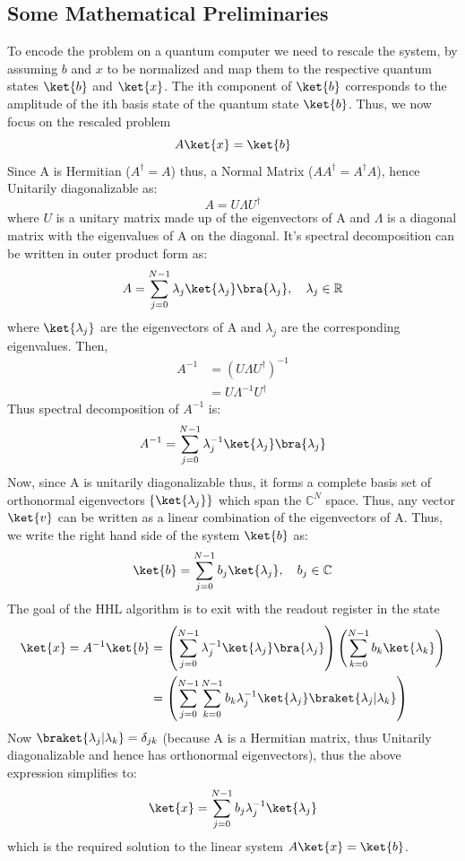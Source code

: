 \documentclass[12pt, oneside]{book}
\theoremstyle{definition}
\theoremstyle{definition}
\theoremstyle{remark}
\begin{document}
\subsection{Some Mathematical Preliminaries}
To encode the problem on a quantum computer we need to rescale the system, by assuming $b$ and $x$ to be normalized and map them to the respective quantum states $\ket{b}$ and $\ket{x}$. The ith component of $\ket{b}$ corresponds to the amplitude of the ith basis state of the quantum state $\ket{b}$. Thus, we now focus on the rescaled problem
\[
A\ket{x}=\ket{b}
\]
Since A is Hermitian ($A^{\dagger}=A$) thus, a Normal Matrix ($AA^{\dagger}=A^{\dagger}A$), hence Unitarily diagonalizable as:
\[
    A=U\Lambda U^{\dagger}
\]
where $U$ is a unitary matrix made up of the eigenvectors of A and $\Lambda$ is a diagonal matrix with the eigenvalues of A on the diagonal.
It's spectral decomposition can be written in outer product form as:
\[
    A=\sum_{j=0}^{N-1}\lambda_j\ket{\lambda_j}\bra{\lambda_j}, \quad \lambda_j\in \mathbb{R}
\]
where $\ket{\lambda_j}$ are the eigenvectors of A and $\lambda_j$ are the corresponding eigenvalues.
Then,
\begin{align*}
    A^{-1}&=(U\Lambda U^{\dagger})^{-1}\\
    &=U\Lambda^{-1}U^{\dagger}
\end{align*}
Thus spectral decomposition of $A^{-1}$ is:
\[
    A^{-1}=\sum_{j=0}^{N-1}\lambda_j^{-1}\ket{\lambda_j}\bra{\lambda_j}
\]
Now, since A is unitarily diagonalizable thus, it forms a complete basis set of orthonormal eigenvectors $\{\ket{\lambda_j}\}$ 
which span the $\mathbb{C}^N$ space. Thus, any vector $\ket{v}$ can be written as a linear combination of the eigenvectors of A. Thus,
we write the right hand side of the system $\ket{b}$ as:
\[
    \ket{b}=\sum_{j=0}^{N-1}b_j\ket{\lambda_j}, \quad b_j\in \mathbb{C}
\]
The goal of the HHL algorithm is to exit with the readout register in the state
\begin{align*}
    \ket{x}=A^{-1}\ket{b}&=\left(\sum_{j=0}^{N-1}\lambda_j^{-1}\ket{\lambda_j}\bra{\lambda_j}\right)\left(\sum_{k=0}^{N-1}b_k\ket{\lambda_k}\right)\\
    &=\left(\sum_{j=0}^{N-1}\sum_{k=0}^{N-1}b_k\lambda_j^{-1}\ket{\lambda_j}\braket{\lambda_j|\lambda_k}\right)\\
\end{align*}
Now $\braket{\lambda_j|\lambda_k}=\delta_{jk}$ (because A is a Hermitian matrix, thus Unitarily diagonalizable and hence has orthonormal eigenvectors), thus the above expression simplifies to:
\[
    \ket{x}=\sum_{j=0}^{N-1}b_j\lambda_j^{-1}\ket{\lambda_j}
\]
which is the required solution to the linear system $A\ket{x}=\ket{b}$.
\end{document}
